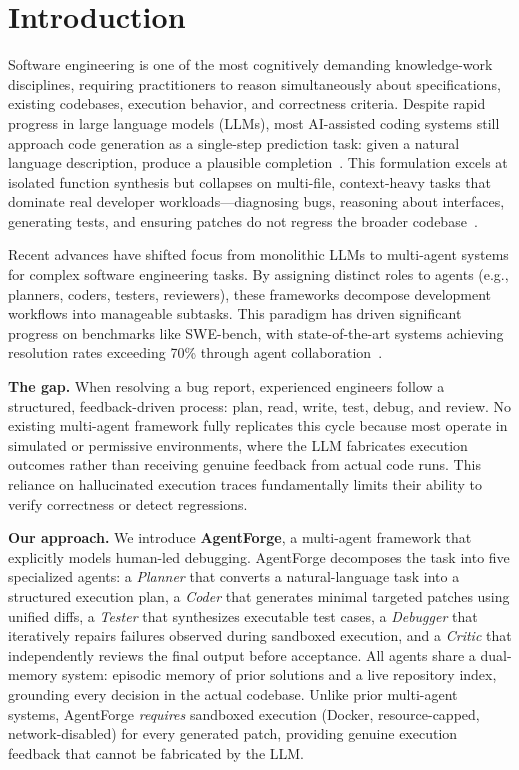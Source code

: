 \section{Introduction}
\label{sec:intro}

Software engineering is one of the most cognitively demanding knowledge-work disciplines, requiring practitioners to reason simultaneously about specifications, existing codebases, execution behavior, and correctness criteria. Despite rapid progress in large language models (LLMs), most AI-assisted coding systems still approach code generation as a single-step prediction task: given a natural language description, produce a plausible completion~\cite{brown2020language}. This formulation excels at isolated function synthesis but collapses on multi-file, context-heavy tasks that dominate real developer workloads—diagnosing bugs, reasoning about interfaces, generating tests, and ensuring patches do not regress the broader codebase~\cite{chen2021codex}.

Recent advances have shifted focus from monolithic LLMs to multi-agent systems for complex software engineering tasks. By assigning distinct roles to agents (e.g., planners, coders, testers, reviewers), these frameworks decompose development workflows into manageable subtasks. This paradigm has driven significant progress on benchmarks like SWE-bench, with state-of-the-art systems achieving resolution rates exceeding 70\% through agent collaboration~\cite{trae2025}.

\textbf{The gap.} When resolving a bug report, experienced engineers follow a structured, feedback-driven process: plan, read, write, test, debug, and review. No existing multi-agent framework fully replicates this cycle because most operate in simulated or permissive environments, where the LLM fabricates execution outcomes rather than receiving genuine feedback from actual code runs. This reliance on hallucinated execution traces fundamentally limits their ability to verify correctness or detect regressions.

\textbf{Our approach.} We introduce \textbf{AgentForge}, a multi-agent framework that explicitly models human-led debugging. AgentForge decomposes the task into five specialized agents: a \textit{Planner} that converts a natural-language task into a structured execution plan, a \textit{Coder} that generates minimal targeted patches using unified diffs, a \textit{Tester} that synthesizes executable test cases, a \textit{Debugger} that iteratively repairs failures observed during sandboxed execution, and a \textit{Critic} that independently reviews the final output before acceptance. All agents share a dual-memory system: episodic memory of prior solutions and a live repository index, grounding every decision in the actual codebase. Unlike prior multi-agent systems, AgentForge \textit{requires} sandboxed execution (Docker, resource-capped, network-disabled) for every generated patch, providing genuine execution feedback that cannot be fabricated by the LLM.

